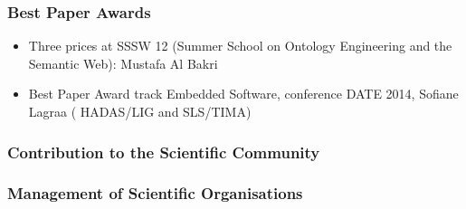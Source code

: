 
\subsubsection*{Best Paper Awards}
\begin{itemize}

\item Three prices at SSSW 12 (Summer School on Ontology Engineering and the Semantic Web): Mustafa Al Bakri  

\item Best Paper Award track Embedded Software, conference DATE 2014, Sofiane Lagraa ( HADAS/LIG and SLS/TIMA) 

\end{itemize}




\subsubsection{Contribution to the Scientific Community}

\subsubsection*{Management of Scientific Organisations}

